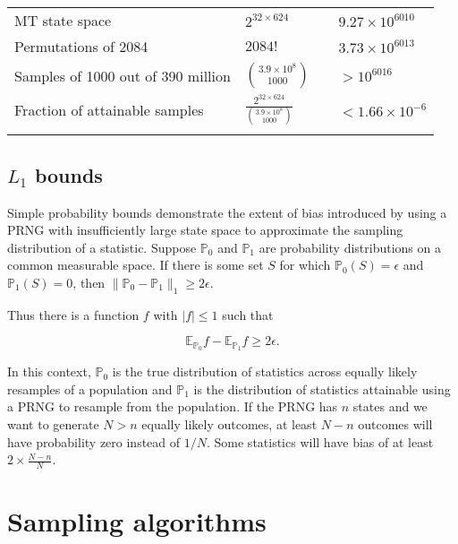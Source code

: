 \documentclass[graybox]{svmult}
\begin{document}
\begin{table}
\begin{tabular}[h]{p{4cm}p{2.4cm}p{4cm}p{2cm}}
MT state space & $2^{32 \times 624}$ & & $9.27\times 10^{6010}$ \\
Permutations of 2084 & $2084!$ &   & $3.73 \times 10^{6013}$ \\
Samples of 1000 out of 390 million & ${3.9\times 10^8 \choose 1000}$ & & $> 10^{6016}$ \\
Fraction of attainable samples & $\frac{2^{32 \times 624}}{{3.9\times 10^8 \choose 1000}}$ &  & $< 1.66 \times 10^{-6}$ \\
\noalign{\smallskip}\svhline\noalign{\smallskip}
\end{tabular}
\end{table}

\subsection{$L_1$ bounds}\label{sec:L1bounds}

Simple probability bounds demonstrate the extent of bias introduced by using a PRNG with insufficiently large
state space to approximate the sampling distribution of a statistic.
Suppose ${\mathbb P}_0$ and ${\mathbb P}_1$ are probability distributions on a common measurable space. 
If there is some set $S$ for which ${\mathbb P}_0(S) = \epsilon$ and ${\mathbb P}_1(S) = 0$, then $\|{\mathbb P}_0 - {\mathbb P}_1 \|_1 \ge 2 \epsilon$.

Thus there is a function $f$ with $|f| \le 1$ such that 

$${\mathbb E}_{{\mathbb P}_0}f -  {\mathbb E}_{{\mathbb P}_1}f \ge 2 \epsilon.$$

In this context, ${\mathbb P}_0$ is the true distribution of statistics across equally likely resamples of a population 
and ${\mathbb P}_1$ is the distribution of statistics attainable using a PRNG to resample from the population.
If the PRNG has $n$ states and we want to generate $N>n$ equally likely outcomes, at least $N-n$ outcomes will have probability zero instead of $1/N$.
Some statistics will have bias of at least $2 \times \frac{N-n}{N}$.

\section{Sampling algorithms}
\label{sec:algorithms}
\end{document}
